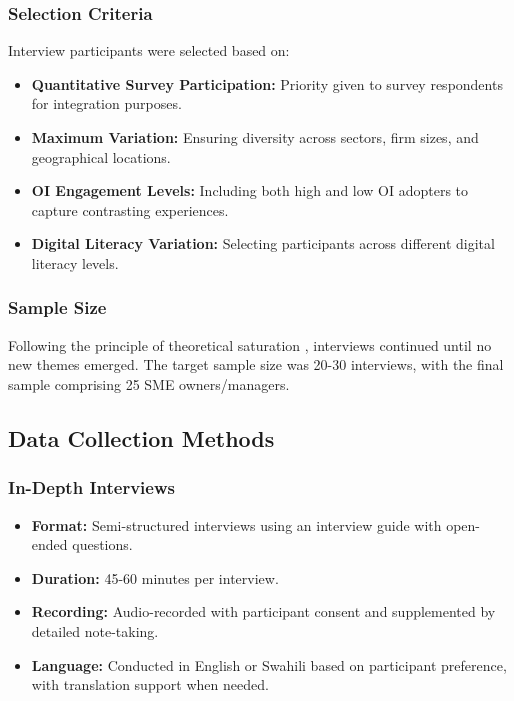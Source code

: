 \subsubsection{Selection Criteria}
Interview participants were selected based on:
\begin{itemize}
    \item \textbf{Quantitative Survey Participation:} Priority given to survey respondents for integration purposes.
    \item \textbf{Maximum Variation:} Ensuring diversity across sectors, firm sizes, and geographical locations.
    \item \textbf{OI Engagement Levels:} Including both high and low OI adopters to capture contrasting experiences.
    \item \textbf{Digital Literacy Variation:} Selecting participants across different digital literacy levels.
\end{itemize}

\subsubsection{Sample Size}
Following the principle of theoretical saturation \citep{glaser1967discovery}, interviews continued until no new themes emerged. The target sample size was 20-30 interviews, with the final sample comprising 25 SME owners/managers.

\subsection{Data Collection Methods}

\subsubsection{In-Depth Interviews}
\begin{itemize}
    \item \textbf{Format:} Semi-structured interviews using an interview guide with open-ended questions.
    \item \textbf{Duration:} 45-60 minutes per interview.
    \item \textbf{Recording:} Audio-recorded with participant consent and supplemented by detailed note-taking.
    \item \textbf{Language:} Conducted in English or Swahili based on participant preference, with translation support when needed.
\end{itemize}

